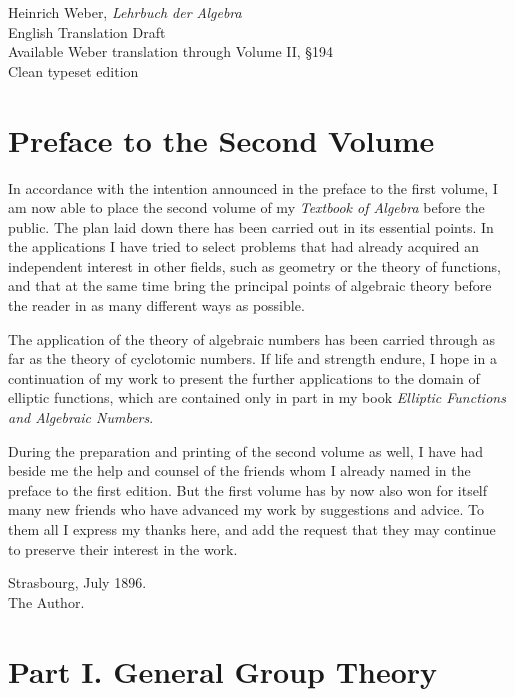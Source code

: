 \documentclass[11pt,a4paper]{book}
\begin{document}
\pagestyle{plain}
\begin{titlepage}
\centering
\vspace*{0.25\textheight}
{\Large Heinrich Weber, \emph{Lehrbuch der Algebra}\\[0.8em]}
{\LARGE English Translation Draft\\[0.8em]}
{\large Available Weber translation through Volume II, \S194\\[1em]}
{\large Clean typeset edition}
\vfill
\end{titlepage}
\chapter*{Preface to the Second Volume}
In accordance with the intention announced in the preface to the first volume, I am now able to place the second volume of my \emph{Textbook of Algebra} before the public. The plan laid down there has been carried out in its essential points. In the applications I have tried to select problems that had already acquired an independent interest in other fields, such as geometry or the theory of functions, and that at the same time bring the principal points of algebraic theory before the reader in as many different ways as possible.

The application of the theory of algebraic numbers has been carried through as far as the theory of cyclotomic numbers. If life and strength endure, I hope in a continuation of my work to present the further applications to the domain of elliptic functions, which are contained only in part in my book \emph{Elliptic Functions and Algebraic Numbers}.

During the preparation and printing of the second volume as well, I have had beside me the help and counsel of the friends whom I already named in the preface to the first edition. But the first volume has by now also won for itself many new friends who have advanced my work by suggestions and advice. To them all I express my thanks here, and add the request that they may continue to preserve their interest in the work.

\begin{flushright}
Strasbourg, July 1896.\\
The Author.
\end{flushright}

\chapter*{Part I. General Group Theory}
\end{document}
